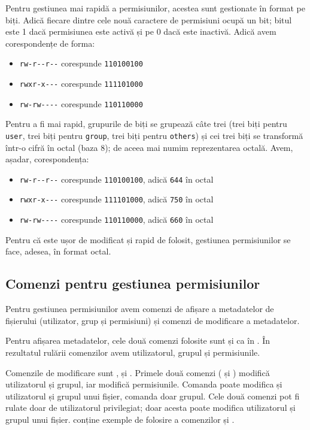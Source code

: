 Pentru gestiunea mai rapidă a permisiunilor, acestea sunt gestionate în format pe biți.
Adică fiecare dintre cele nouă caractere de permisiuni ocupă un bit;
bitul este 1 dacă permisiunea este activă și pe 0 dacă este inactivă.
Adică avem corespondențe de forma:

\begin{itemize}
  \item \texttt{rw-r-{}-r-{}-} corespunde \texttt{110100100}
  \item \texttt{rwxr-x-{}-{}-} corespunde \texttt{111101000}
  \item \texttt{rw-rw-{}-{}-{}-} corespunde \texttt{110110000}
\end{itemize}

Pentru a fi mai rapid, grupurile de biți se grupează câte trei (trei biți pentru \texttt{user}, trei biți pentru \texttt{group}, trei biți pentru \texttt{others}) și cei trei biți se transformă într-o cifră în octal (baza 8);
de aceea mai numim reprezentarea octală.
Avem, așadar, corespondența:

\begin{itemize}
  \item \texttt{rw-r-{}-r-{}-} corespunde \texttt{110100100}, adică \texttt{644} în octal
  \item \texttt{rwxr-x-{}-{}-} corespunde \texttt{111101000}, adică \texttt{750} în octal
  \item \texttt{rw-rw-{}-{}-{}-} corespunde \texttt{110110000}, adică \texttt{660} în octal
\end{itemize}

Pentru că este ușor de modificat și rapid de folosit, gestiunea permisiunilor se face, adesea, în format octal.

\subsection{Comenzi pentru gestiunea permisiunilor}
\label{sec:user:perm-cmd}

Pentru gestiunea permisiunilor avem comenzi de afișare a metadatelor de fișierului (utilizator, grup și permisiuni) și comenzi de modificare a metadatelor.

Pentru afișarea metadatelor, cele două comenzi folosite sunt  și  ca în .
În rezultatul rulării comenzilor avem utilizatorul, grupul și permisiunile.

Comenzile de modificare sunt ,  și .
Primele două comenzi ( și ) modifică utilizatorul și grupul, iar  modifică permisiunile.
Comanda  poate modifica și utilizatorul și grupul unui fișier, comanda  doar grupul.
Cele două comenzi pot fi rulate doar de utilizatorul privilegiat;
doar acesta poate modifica utilizatorul și grupul unui fișier.
 conține exemple de folosire a comenzilor  și .

